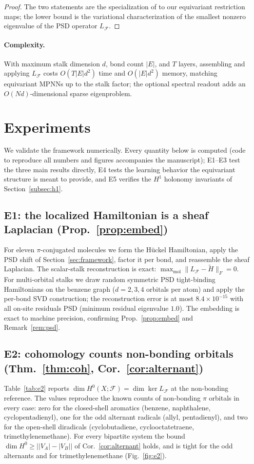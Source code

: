 \documentclass[pdflatex,sn-mathphys-num]{sn-jnl}%
\newcommand{\F}{\mathcal{F}}
\newcommand{\X}{X}
\theoremstyle{thmstyleone}
\theoremstyle{thmstyletwo}
\theoremstyle{thmstylethree}
\begin{document}
\begin{proof}
The two statements are the specialization of \cite[Thm.\ on Dirichlet energy and
oversmoothing]{bodnar2022} to our equivariant restriction maps; the lower bound is
the variational characterization of the smallest nonzero eigenvalue of the PSD
operator $L_\F$.
\end{proof}

\paragraph{Complexity.} With maximum stalk dimension $d$, bond count $|E|$, and
$T$ layers, assembling and applying $L_\F$ costs $O(T|E|d^2)$ time and
$O(|E|d^2)$ memory, matching equivariant MPNNs up to the stalk factor; the
optional spectral readout adds an $O(Nd)$-dimensional sparse eigenproblem.

\section{Experiments}\label{sec:exp}

We validate the framework numerically. Every quantity below is computed (code to
reproduce all numbers and figures accompanies the manuscript); E1--E3 test the
three main results directly, E4 tests the learning behavior the equivariant
structure is meant to provide, and E5 verifies the $H^1$ holonomy invariants of
Section~\ref{subsec:h1}.

\subsection{E1: the localized Hamiltonian is a sheaf Laplacian (Prop.~\ref{prop:embed})}
For eleven $\pi$-conjugated molecules we form the H\"uckel Hamiltonian, apply the
PSD shift of Section~\ref{sec:framework}, factor it per bond, and reassemble the
sheaf Laplacian. The scalar-stalk reconstruction is exact:
$\max_{\text{mol}}\|L_{\F}-\tilde H\|_F=0$. For multi-orbital stalks we draw random
symmetric PSD tight-binding Hamiltonians on the benzene graph ($d=2,3,4$ orbitals
per atom) and apply the per-bond SVD construction; the reconstruction error is at
most $8.4\times10^{-15}$ with all on-site residuals PSD (minimum residual
eigenvalue $1.0$). The embedding is exact to machine precision, confirming
Prop.~\ref{prop:embed} and Remark~\ref{rem:psd}.

\subsection{E2: cohomology counts non-bonding orbitals (Thm.~\ref{thm:coh}, Cor.~\ref{cor:alternant})}
Table~\ref{tab:e2} reports $\dim H^0(\X;\F)=\dim\ker L_{\F}$ at the non-bonding
reference. The values reproduce the known counts of non-bonding $\pi$ orbitals in
every case: zero for the closed-shell aromatics (benzene, naphthalene,
cyclopentadienyl), one for the odd alternant radicals (allyl, pentadienyl), and two
for the open-shell diradicals (cyclobutadiene, cyclooctatetraene,
trimethylenemethane). For every bipartite system the bound
$\dim H^0\ge \big||V_A|-|V_B|\big|$ of Cor.~\ref{cor:alternant} holds, and is tight
for the odd alternants and for trimethylenemethane (Fig.~\ref{fig:e2}).
\end{document}
